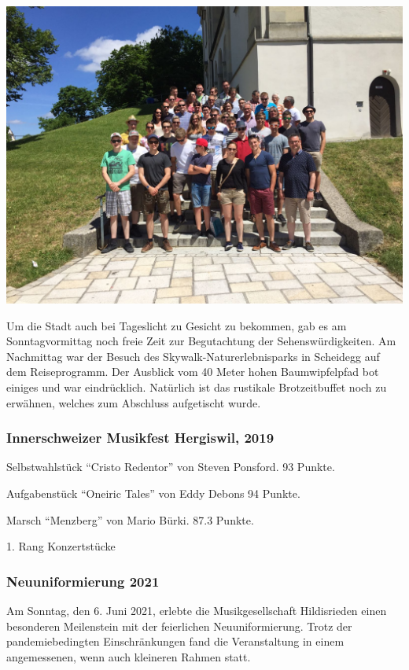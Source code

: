 \begin{history}
    \begin{MulticolFigure}
        \centering
        \includegraphics[width=0.93\linewidth]{./chap/2001-2024/2017/Reisegruppe.jpg}
    \end{MulticolFigure}

    Um die Stadt auch bei Tageslicht zu Gesicht zu bekommen, gab es am
    Sonntagvormittag noch freie Zeit zur Begutachtung der
    Sehenswürdigkeiten. Am Nachmittag war der Besuch des
    Skywalk-Naturerlebnisparks in Scheidegg auf dem Reiseprogramm. Der
    Ausblick vom 40 Meter hohen Baumwipfelpfad bot einiges und war
    eindrücklich. Natürlich ist das rustikale Brotzeitbuffet noch zu
    erwähnen, welches zum Abschluss aufgetischt wurde.

    \subsubsection*{Innerschweizer Musikfest Hergiswil, 2019}

    Selbstwahlstück   \enquote{Cristo Redentor} von Steven Ponsford. 93 Punkte.

    Aufgabenstück \enquote{Oneiric Tales} von Eddy Debons 94 Punkte.

    Marsch \enquote{Menzberg} von Mario Bürki. 87.3 Punkte.

    1. Rang Konzertstücke


    \subsubsection*{Neuuniformierung 2021}
    Am Sonntag, den 6. Juni 2021, erlebte die Musikgesellschaft Hildisrieden
    einen besonderen Meilenstein mit der feierlichen Neuuniformierung. Trotz der
    pandemiebedingten Einschränkungen fand die Veranstaltung in einem
    angemessenen, wenn auch kleineren Rahmen statt.


\end{history}
